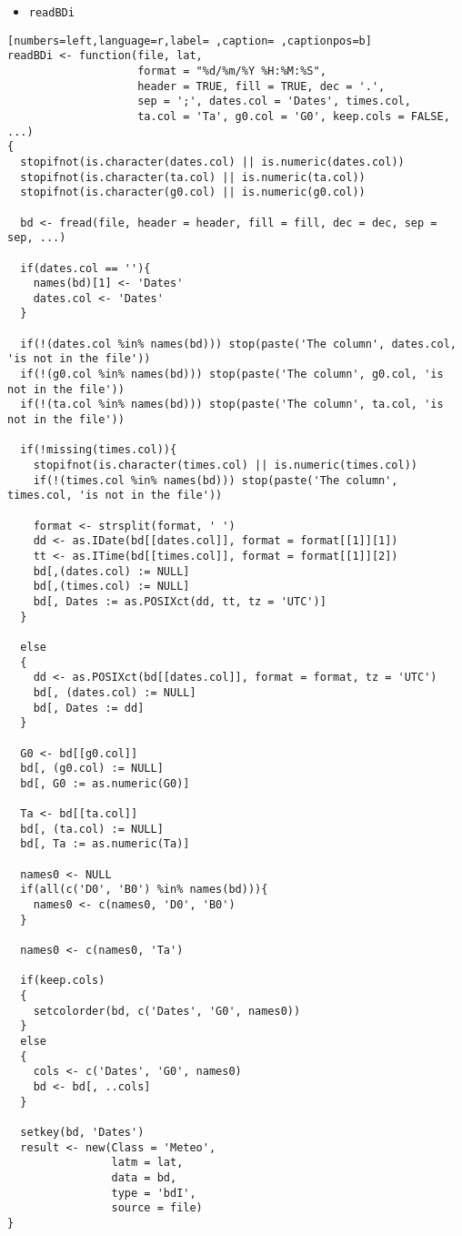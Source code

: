 \begin{itemize}
\item \texttt{readBDi}
\end{itemize}
\begin{lstlisting}[numbers=left,language=r,label= ,caption= ,captionpos=b]
readBDi <- function(file, lat,
                    format = "%d/%m/%Y %H:%M:%S",
                    header = TRUE, fill = TRUE, dec = '.',
                    sep = ';', dates.col = 'Dates', times.col,
                    ta.col = 'Ta', g0.col = 'G0', keep.cols = FALSE, ...)
{
  stopifnot(is.character(dates.col) || is.numeric(dates.col))
  stopifnot(is.character(ta.col) || is.numeric(ta.col))
  stopifnot(is.character(g0.col) || is.numeric(g0.col))

  bd <- fread(file, header = header, fill = fill, dec = dec, sep = sep, ...)

  if(dates.col == ''){
    names(bd)[1] <- 'Dates'
    dates.col <- 'Dates'
  }
  
  if(!(dates.col %in% names(bd))) stop(paste('The column', dates.col, 'is not in the file'))
  if(!(g0.col %in% names(bd))) stop(paste('The column', g0.col, 'is not in the file'))
  if(!(ta.col %in% names(bd))) stop(paste('The column', ta.col, 'is not in the file'))
  
  if(!missing(times.col)){
    stopifnot(is.character(times.col) || is.numeric(times.col))
    if(!(times.col %in% names(bd))) stop(paste('The column', times.col, 'is not in the file'))
    
    format <- strsplit(format, ' ')
    dd <- as.IDate(bd[[dates.col]], format = format[[1]][1])
    tt <- as.ITime(bd[[times.col]], format = format[[1]][2])
    bd[,(dates.col) := NULL]
    bd[,(times.col) := NULL]
    bd[, Dates := as.POSIXct(dd, tt, tz = 'UTC')]
  }

  else
  {
    dd <- as.POSIXct(bd[[dates.col]], format = format, tz = 'UTC')
    bd[, (dates.col) := NULL]
    bd[, Dates := dd]
  }

  G0 <- bd[[g0.col]]
  bd[, (g0.col) := NULL]
  bd[, G0 := as.numeric(G0)]
  
  Ta <- bd[[ta.col]]
  bd[, (ta.col) := NULL]
  bd[, Ta := as.numeric(Ta)]

  names0 <- NULL
  if(all(c('D0', 'B0') %in% names(bd))){
    names0 <- c(names0, 'D0', 'B0')
  }

  names0 <- c(names0, 'Ta')
  
  if(keep.cols)
  {
    setcolorder(bd, c('Dates', 'G0', names0))
  }
  else
  {
    cols <- c('Dates', 'G0', names0)
    bd <- bd[, ..cols]
  }
  
  setkey(bd, 'Dates')
  result <- new(Class = 'Meteo',
                latm = lat,
                data = bd,
                type = 'bdI',
                source = file)
}
\end{lstlisting}
